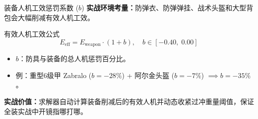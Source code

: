 \documentclass[aspectratio=169]{beamer}
\begin{document}
\begin{frame}{装备人机工效惩罚系数 ($b$)}
    \textbf{实战环境考量：}防弹衣、防弹弹挂、战术头盔和大型背包会大幅削减有效人机工效。

    \vspace{0.3cm}
    \begin{block}{有效人机工效公式}
        \[
        E_{\text{eff}} = E_{\text{weapon}} \cdot (1 + b), \quad b \in [-0.40, \; 0.00]
        \]
        \begin{itemize}
            \item $b$：防具与装备的总人机惩罚百分比。
            \item 例：重型6级甲 Zabralo ($b = -28\%$) + 阿尔金头盔 ($b = -7\%$) $\implies b = -35\%$。
        \end{itemize}
    \end{block}

    \vspace{0.3cm}
    \textbf{实战价值：}求解器自动计算装备削减后的有效人机并动态收紧过冲重量阈值，保证全装实战中开镜指哪打哪。
\end{frame}

\end{document}
